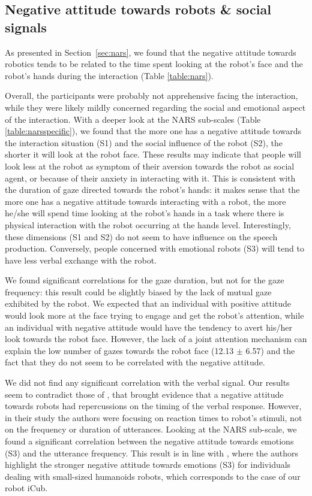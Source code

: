 \documentclass[twocolumn]{svjour3}          %
\begin{document}
\subsection{Negative attitude towards robots \& social signals} 
As presented in Section~\ref{sec:nars}, we found that the negative attitude towards robotics tends to be related to the time spent looking at the robot's face and the robot's hands during the interaction (Table \ref{table:nars}).

Overall, the participants were probably not apprehensive facing the interaction, while they were likely mildly concerned regarding the social and emotional aspect of the interaction.
With a deeper look at the NARS sub-scales (Table \ref{table:narsspecific}), we found that the more one has a negative attitude towards the interaction situation (S1) and the social influence of the robot (S2), the shorter it will look at the robot face. 
These results may indicate that people will look less at the robot as symptom of their aversion towards the robot as social agent, or because of their anxiety in interacting with it. 
This is consistent with the duration of gaze directed towards the robot's hands: it makes sense that the more one has a negative attitude towards interacting with a robot, the more he/she will spend time looking at the robot's hands in a task where there is physical interaction with the robot occurring at the hands level.
Interestingly, these dimensions (S1 and S2) do not seem to have influence on the speech production. 
Conversely, people concerned with emotional robots (S3) will tend to have less verbal exchange with the robot. 

We found significant correlations for the gaze duration, but not for the gaze frequency: this result could be slightly biased by the lack of mutual gaze exhibited by the robot.
We expected that an individual with positive attitude would look more at the face trying to engage and get the robot's attention, while an individual with negative attitude would have the tendency to avert his/her look towards the robot face.
However, the lack of a joint attention mechanism can explain the low number of gazes towards the robot face (12.13 $\pm$ 6.57) and the fact that they do not seem to be correlated with the negative attitude.

We did not find any significant correlation with the verbal signal.
Our results seem to contradict those of \cite{Nomura2008}, that brought evidence that a negative attitude towards robots had repercussions on the timing of the verbal response. However, in their study the authors were focusing on reaction times to robot's stimuli, not on the frequency or duration of utterances.
Looking at the NARS sub-scale, we found a significant correlation between the negative attitude towards emotions (S3) and the utterance frequency. This result is in line with \cite{NARS2006}, where the authors highlight the stronger negative attitude towards emotions (S3) for individuals dealing with small-sized humanoids robots, which corresponds to the case of our robot iCub.
\end{document}
